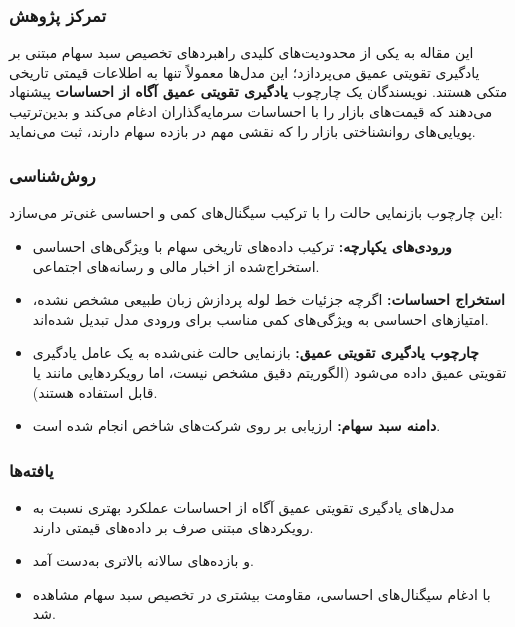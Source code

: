 \documentclass[12pt, a4paper]{report}
\begin{document}
\subsubsection{تمرکز پژوهش}
این مقاله به یکی از محدودیت‌های کلیدی راهبردهای تخصیص سبد سهام مبتنی بر یادگیری تقویتی عمیق می‌پردازد؛ این مدل‌ها معمولاً تنها به اطلاعات قیمتی تاریخی متکی هستند. نویسندگان یک چارچوب \textbf{یادگیری تقویتی عمیق آگاه از احساسات} پیشنهاد می‌دهند که قیمت‌های بازار را با احساسات سرمایه‌گذاران ادغام می‌کند و بدین‌ترتیب پویایی‌های روانشناختی بازار را که نقشی مهم در بازده سهام دارند، ثبت می‌نماید.  

\subsubsection{روش‌شناسی}
این چارچوب بازنمایی حالت را با ترکیب سیگنال‌های کمی و احساسی غنی‌تر می‌سازد:
\begin{itemize}
    \item \textbf{ورودی‌های یکپارچه:} ترکیب داده‌های تاریخی سهام با ویژگی‌های احساسی استخراج‌شده از اخبار مالی و رسانه‌های اجتماعی.  
    \item \textbf{استخراج احساسات:} اگرچه جزئیات خط لوله پردازش زبان طبیعی مشخص نشده، امتیازهای احساسی به ویژگی‌های کمی مناسب برای ورودی مدل تبدیل شده‌اند.  
    \item \textbf{چارچوب یادگیری تقویتی عمیق:} بازنمایی حالت غنی‌شده به یک عامل یادگیری تقویتی عمیق داده می‌شود (الگوریتم دقیق مشخص نیست، اما رویکردهایی مانند  یا  قابل استفاده هستند).  
    \item \textbf{دامنه سبد سهام:} ارزیابی بر روی شرکت‌های شاخص  انجام شده است.  
\end{itemize}

\subsubsection{یافته‌ها}
\begin{itemize}
    \item مدل‌های یادگیری تقویتی عمیق آگاه از احساسات عملکرد بهتری نسبت به رویکردهای مبتنی صرف بر داده‌های قیمتی دارند.  
    \item {} و بازده‌های سالانه بالاتری به‌دست آمد.  
    \item با ادغام سیگنال‌های احساسی، مقاومت بیشتری در تخصیص سبد سهام مشاهده شد.  
\end{itemize}
\end{document}
